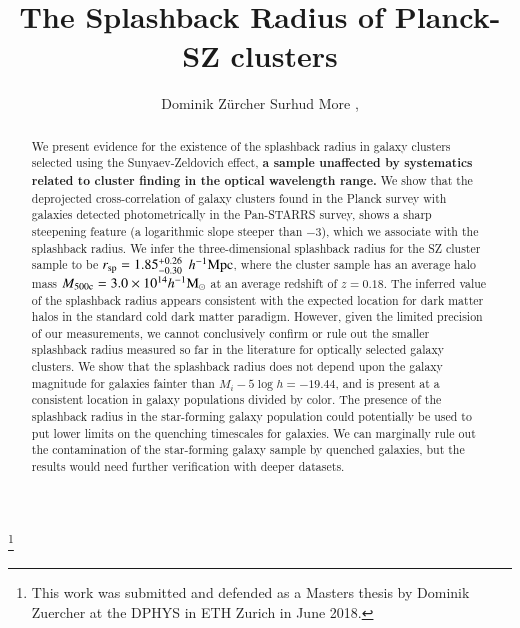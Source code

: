 \documentclass[iop, apjl, twocolappendix, numberedappendix]{emulateapj}
\def\mpch{h^{-1}{\rm Mpc}}
\def\msunh{h^{-1}{\rm M_{\odot}}}
\begin{document}
\title{The Splashback Radius of Planck-SZ clusters}

\thanks{This work was submitted and defended as a Masters thesis by Dominik
Zuercher at the DPHYS in ETH Zurich in June 2018.}

\author{
Dominik Zürcher 
Surhud More ,
}

\begin{abstract}
We present evidence for the existence of the splashback radius in galaxy
clusters selected using the Sunyaev-Zeldovich effect, {\bf a sample unaffected by
systematics related to cluster finding in the optical wavelength range.} We show
that the deprojected cross-correlation of galaxy clusters found in the Planck
survey with galaxies detected photometrically in the Pan-STARRS survey, shows a
sharp steepening feature (a logarithmic slope steeper than $-3$), which we
associate with the splashback radius. We infer the three-dimensional splashback
radius for the SZ cluster sample to be $r_{\rm sp}=1.85_{-0.30}^{+0.26}$
$\mpch$, where the cluster sample has an average halo mass $M_{\rm
500c}=3.0\times10^{14}\msunh$ at an average redshift of $z=0.18$.  The inferred
value of the splashback radius appears consistent with the expected location
for dark matter halos in the standard cold dark matter paradigm. However, given
the limited precision of our measurements, we cannot conclusively confirm or
rule out the smaller splashback radius measured so far in the literature for
optically selected galaxy clusters. We show that the splashback radius does not
depend upon the galaxy magnitude for galaxies fainter than $M_i-5\log
h=-19.44$, and is present at a consistent location in galaxy populations
divided by color. The presence of the splashback radius in the star-forming
galaxy population could potentially be used to put lower limits on the
quenching timescales for galaxies. We can marginally rule out the contamination
of the star-forming galaxy sample by quenched galaxies, but the results would
need further verification with deeper datasets.

\end{abstract}
\end{document}
